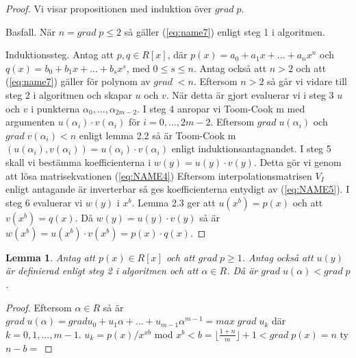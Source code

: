 \documentclass[a4paper]{article}
\newtheorem{lemma}[theorem]{Lemma}
\begin{document}
\begin{proof}
Vi visar propositionen med induktion över $grad \; p$.

Basfall. När $n = grad \; p \leq 2$ så gäller (\ref{eq:name7}) enligt steg 1 i algoritmen.

Induktionssteg. Antag att $p, q \in R[x]$, där $p(x)= a_0 + a_1 x + ... + a_n x^n$ och
$q(x) = b_0 + b_1 x + ... + b_s x^s$, med $0 \leq s \leq n$. Antag också att $n > 2$ och att (\ref{eq:name7}) gäller
för polynom av $grad \; < n$. Eftersom $n > 2$ så går vi vidare till steg 2 i algoritmen och skapar $u$ och $v$.
När detta är gjort evaluerar vi i steg 3 $u$ och $v$ i punkterna $\alpha_0, ...,  \alpha_{2m-2}$. I steg 4 anropar
vi Toom-Cook m med argumenten $u(\alpha_i) \cdot v(\alpha_i)$ för $i = 0, \ldots , 2m-2$. Eftersom $grad \; u(\alpha_i)$
och $grad \; v(\alpha_i) < n$ enligt lemma 2.2 så är Toom-Cook m $(u(\alpha_i), v(\alpha_i)) = u(\alpha_i) \cdot v(\alpha_i)$ enligt
induktionsantagnandet.
I steg 5 skall vi bestämma koefficienterna i $w(y)=u(y) \cdot v(y)$. Detta gör vi genom att lösa matrisekvationen (\ref{eq:NAME4})
Eftersom interpolationsmatrisen $V_I$ enligt antagande är inverterbar så ges koefficienterna entydigt av (\ref{eq:NAME5}).
I steg 6 evaluerar vi $w(y)$ i $x^b$. Lemma 2.3 ger att $u(x^b)=p(x)$ och att $v(x^b)=q(x)$. Då $w(y)=u(y) \cdot v(y)$ så är
$w(x^b)=u(x^b) \cdot v(x^b)=p(x) \cdot q(x)$.
\end{proof}

\begin{lemma}
 Antag att $p(x) \in R[x]$ och att $grad \; p \geq 1$. Antag också att $u(y)$ är definierad enligt steg 2 i algoritmen och att $\alpha \in R$.
Då är $grad \; u(\alpha) < grad \; p$.
\end{lemma}
\begin{proof}
 Eftersom $\alpha \in R$ så är $grad \; u(\alpha) = grad u_0 + u_1 \alpha + ... + u_{m-1}\alpha^{m-1} = max \; grad \; u_k$ där $k={0,1,...,m-1}$.
$u_k = p(x)/x^{xb}$ mod $x^b < b = \lfloor \frac{1 + n}{m}\rfloor + 1 < grad \; p(x) = n$ ty $n-b = $
\end{proof}
\end{document}
